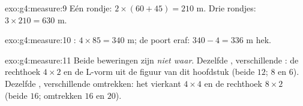 \begin{solution}{exo:g4:measure:9}
Eén rondje: $2 \times (60 + 45) = 210$ m. Drie rondjes:
$3 \times 210 = 630$ m.
\end{solution}

\begin{solution}{exo:g4:measure:10}
: $4 \times 85 = 340$ m; de poort eraf: $340 - 4 = 336$ m hek.
\end{solution}

\begin{solution}{exo:g4:measure:11}
Beide beweringen zijn \emph{niet waar}. Dezelfde , verschillende
: de rechthoek $4 \times 2$ en de L-vorm uit de figuur van dit
hoofdstuk (beide  $12$;  $8$ en $6$). Dezelfde ,
verschillende omtrekken: het vierkant $4 \times 4$ en de rechthoek
$8 \times 2$ (beide  $16$; omtrekken $16$ en $20$).
\end{solution}
